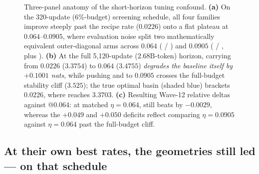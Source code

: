 \begin{figure}[t]
{%
}
\caption{Three-panel anatomy of the short-horizon tuning confound.
\textbf{(a)} On the 320-update ($6\%$-budget) screening schedule, all four
families improve steeply past the recipe rate ($0.0226$) onto a flat plateau at
$0.064$--$0.0905$, where evaluation noise split two mathematically equivalent
outer-diagonal arms across $0.064$ ( / \fused{}) and $0.0905$
( / \outerdiag{}, plus ).
\textbf{(b)} At the full 5{,}120-update ($2.68\text{B}$-token) horizon, carrying
 from $0.0226$ ($3.3754$) to $0.064$ ($3.4755$) \emph{degrades the
baseline itself by $+0.1001$ nats}, while pushing  and
 to $0.0905$ crosses the full-budget stability cliff ($3.525$);
the true optimal basin (shaded blue) brackets $0.0226$, where 
reaches $3.3703$.
\textbf{(c)} Resulting Wave-12 relative deltas against @$0.064$: at
matched $\eta=0.064$,  still beats  by $-0.0029$,
whereas the $+0.049$ and $+0.050$ deficits reflect comparing $\eta=0.0905$
against $\eta=0.064$ past the full-budget cliff.}
\label{fig:lr}
\end{figure}

\subsection{At their own best rates, the geometries still led --- on that schedule}

